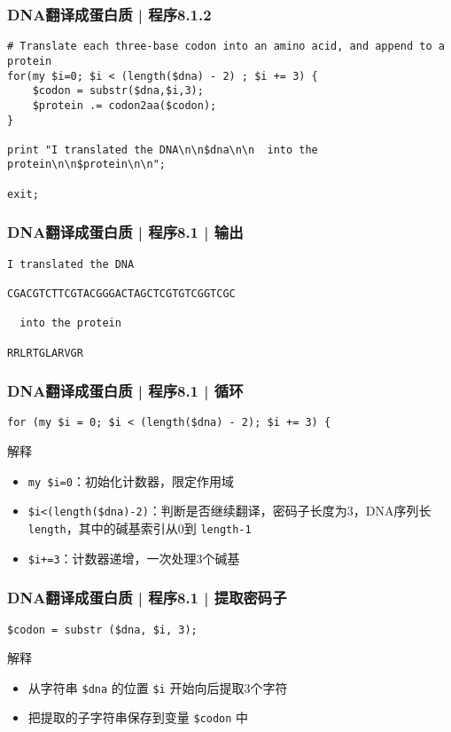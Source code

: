 \begin{frame}[fragile]
  \frametitle{DNA翻译成蛋白质 | 程序8.1.2}
\begin{lstlisting}[firstnumber=13]
# Translate each three-base codon into an amino acid, and append to a protein 
for(my $i=0; $i < (length($dna) - 2) ; $i += 3) {
    $codon = substr($dna,$i,3);
    $protein .= codon2aa($codon);
}

print "I translated the DNA\n\n$dna\n\n  into the protein\n\n$protein\n\n";

exit;
\end{lstlisting}
\end{frame}

\begin{frame}[fragile]
  \frametitle{DNA翻译成蛋白质 | 程序8.1 | 输出}
\begin{lstlisting}
I translated the DNA

CGACGTCTTCGTACGGGACTAGCTCGTGTCGGTCGC

  into the protein

RRLRTGLARVGR
\end{lstlisting}
\end{frame}

\begin{frame}[fragile]
  \frametitle{DNA翻译成蛋白质 | 程序8.1 | \alert{循环}}
\begin{lstlisting}
for (my $i = 0; $i < (length($dna) - 2); $i += 3) {
\end{lstlisting}
\pause
\begin{block}{解释}
  \begin{itemize}
    \item \verb|my $i=0|：初始化计数器，限定作用域
    \item \verb|$i<(length($dna)-2)|：判断是否继续翻译，密码子长度为3，DNA序列长 \verb|length|，其中的碱基索引从0到 \verb|length-1|
    \item \verb|$i+=3|：计数器递增，一次处理3个碱基
  \end{itemize}
\end{block}
\end{frame}

\begin{frame}[fragile]
  \frametitle{DNA翻译成蛋白质 | 程序8.1 | \alert{提取密码子}}
\begin{lstlisting}
$codon = substr ($dna, $i, 3);
\end{lstlisting}
\pause
\begin{block}{解释}
  \begin{itemize}
    \item 从字符串 \verb|$dna| 的位置 \verb|$i| 开始向后提取3个字符
    \item 把提取的子字符串保存到变量 \verb|$codon| 中
  \end{itemize}
\end{block}
\end{frame}

